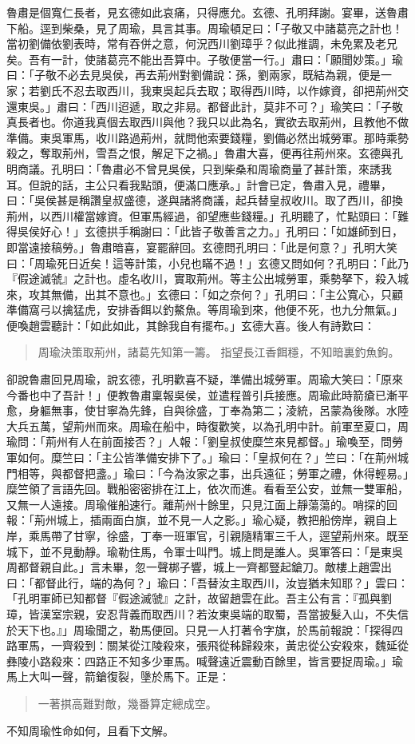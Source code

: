 魯肅是個寬仁長者，見玄德如此哀痛，只得應允。玄德、孔明拜謝。宴畢，送魯肅下船。逕到柴桑，見了周瑜，具言其事。周瑜頓足曰：「子敬又中諸葛亮之計也！當初劉備依劉表時，常有吞併之意，何況西川劉璋乎？似此推調，未免累及老兄矣。吾有一計，使諸葛亮不能出吾算中。子敬便當一行。」肅曰：「願聞妙策。」瑜曰：「子敬不必去見吳侯，再去荊州對劉備說：孫，劉兩家，既結為親，便是一家；若劉氏不忍去取西川，我東吳起兵去取；取得西川時，以作嫁資，卻把荊州交還東吳。」肅曰：「西川迢遞，取之非易。都督此計，莫非不可？」瑜笑曰：「子敬真長者也。你道我真個去取西川與他？我只以此為名，實欲去取荊州，且教他不做準備。東吳軍馬，收川路過荊州，就問他索要錢糧，劉備必然出城勞軍。那時乘勢殺之，奪取荊州，雪吾之恨，解足下之禍。」魯肅大喜，便再往荊州來。玄德與孔明商議。孔明曰：「魯肅必不曾見吳侯，只到柴桑和周瑜商量了甚計策，來誘我耳。但說的話，主公只看我點頭，便滿口應承。」計會已定，魯肅入見，禮畢，曰：「吳侯甚是稱讚皇叔盛德，遂與諸將商議，起兵替皇叔收川。取了西川，卻換荊州，以西川權當嫁資。但軍馬經過，卻望應些錢糧。」孔明聽了，忙點頭曰：「難得吳侯好心！」玄德拱手稱謝曰：「此皆子敬善言之力。」孔明曰：「如雄師到日，即當遠接稿勞。」魯肅暗喜，宴罷辭回。玄德問孔明曰：「此是何意？」孔明大笑曰：「周瑜死日近矣！這等計策，小兒也瞞不過！」玄德又問如何？孔明曰：「此乃『假途滅虢』之計也。虛名收川，實取荊州。等主公出城勞軍，乘勢拏下，殺入城來，攻其無備，出其不意也。」玄德曰：「如之奈何？」孔明曰：「主公寬心，只顧準備窩弓以擒猛虎，安排香餌以釣鰲魚。等周瑜到來，他便不死，也九分無氣。」便喚趙雲聽計：「如此如此，其餘我自有擺布。」玄德大喜。後人有詩歎曰：

\begin{quote}
周瑜決策取荊州，諸葛先知第一籌。
指望長江香餌穩，不知暗裏釣魚鉤。
\end{quote}

卻說魯肅回見周瑜，說玄德，孔明歡喜不疑，準備出城勞軍。周瑜大笑曰：「原來今番也中了吾計！」便教魯肅稟報吳侯，並遣程普引兵接應。周瑜此時箭瘡已漸平愈，身軀無事，使甘寧為先鋒，自與徐盛，丁奉為第二；淩統，呂蒙為後隊。水陸大兵五萬，望荊州而來。周瑜在船中，時復歡笑，以為孔明中計。前軍至夏口，周瑜問：「荊州有人在前面接否？」人報：「劉皇叔使糜竺來見都督。」瑜喚至，問勞軍如何。糜竺曰：「主公皆準備安排下了。」瑜曰：「皇叔何在？」竺曰：「在荊州城門相等，與都督把盞。」瑜曰：「今為汝家之事，出兵遠征；勞軍之禮，休得輕易。」糜竺領了言語先回。戰船密密排在江上，依次而進。看看至公安，並無一雙軍船，又無一人遠接。周瑜催船速行。離荊州十餘里，只見江面上靜蕩蕩的。哨探的回報：「荊州城上，插兩面白旗，並不見一人之影。」瑜心疑，教把船傍岸，親自上岸，乘馬帶了甘寧，徐盛，丁奉一班軍官，引親隨精軍三千人，逕望荊州來。既至城下，並不見動靜。瑜勒住馬，令軍士叫門。城上問是誰人。吳軍答曰：「是東吳周都督親自此。」言未畢，忽一聲梆子響，城上一齊都豎起鎗刀。敵樓上趙雲出曰：「都督此行，端的為何？」瑜曰：「吾替汝主取西川，汝豈猶未知耶？」雲曰：「孔明軍師已知都督『假途滅虢』之計，故留趙雲在此。吾主公有言：『孤與劉璋，皆漢室宗親，安忍背義而取西川？若汝東吳端的取蜀，吾當披髮入山，不失信於天下也。』」周瑜聞之，勒馬便回。只見一人打著令字旗，於馬前報說：「探得四路軍馬，一齊殺到：關某從江陵殺來，張飛從秭歸殺來，黃忠從公安殺來，魏延從彝陵小路殺來：四路正不知多少軍馬。喊聲遠近震動百餘里，皆言要捉周瑜。」瑜馬上大叫一聲，箭鎗復裂，墬於馬下。正是：

\begin{quote}
一著掑高難對敵，幾番算定總成空。
\end{quote}

不知周瑜性命如何，且看下文解。

